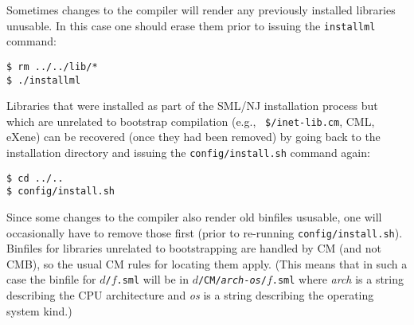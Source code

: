 Sometimes changes to the compiler will render any previously installed
libraries unusable.  In this case one should erase them prior to
issuing the {\tt installml} command:

\begin{verbatim}
$ rm ../../lib/*
$ ./installml
\end{verbatim}

Libraries that were installed as part of the SML/NJ installation
process but which are unrelated to bootstrap compilation (e.g., {\tt
\$/inet-lib.cm}, CML, eXene) can be recovered (once they had been
removed) by going back to the installation directory and issuing the
{\tt config/install.sh} command again:

\begin{verbatim}
$ cd ../..
$ config/install.sh
\end{verbatim}

Since some changes to the compiler also render old binfiles ususable,
one will occasionally have to remove those first (prior to re-running
{\tt config/install.sh}).  Binfiles for libraries unrelated to
bootstrapping are handled by CM (and not CMB), so the usual CM rules
for locating them apply.  (This means that in such a case the binfile
for {\tt $d$/$f$.sml} will be in
{\tt $d$/CM/{\it arch}-{\it os}/$f$.sml}
where {\it arch} is a string describing the CPU
architecture and {\it os} is a string describing the operating system
kind.)
